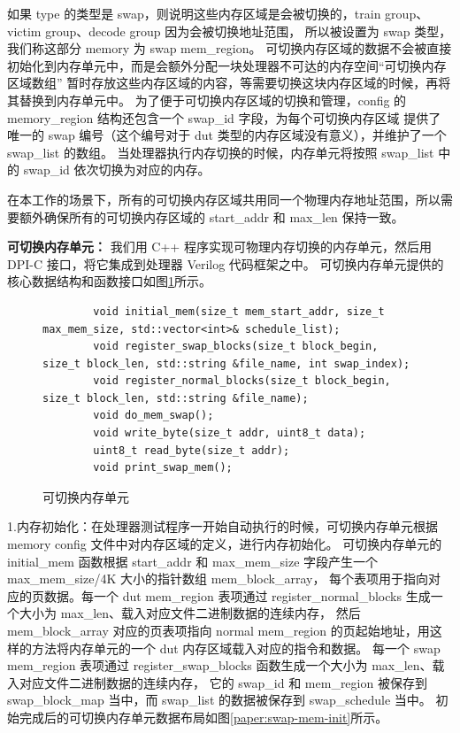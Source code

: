 如果 type 的类型是 swap，则说明这些内存区域是会被切换的，train group、victim group、decode group 因为会被切换地址范围，
所以被设置为 swap 类型，我们称这部分 memory 为 swap mem\_region。
可切换内存区域的数据不会被直接初始化到内存单元中，而是会额外分配一块处理器不可达的内存空间“可切换内存区域数组”
暂时存放这些内存区域的内容，等需要切换这块内存区域的时候，再将其替换到内存单元中。
为了便于可切换内存区域的切换和管理，config 的 memory\_region 结构还包含一个 swap\_id 字段，为每个可切换内存区域
提供了唯一的 swap 编号（这个编号对于 dut 类型的内存区域没有意义），并维护了一个 swap\_list 的数组。
当处理器执行内存切换的时候，内存单元将按照 swap\_list 中的 swap\_id 依次切换为对应的内存。\par 

在本工作的场景下，所有的可切换内存区域共用同一个物理内存地址范围，所以需要额外确保所有的可切换内存区域的 start\_addr
和 max\_len 保持一致。\par

\textbf{可切换内存单元：}
我们用 C++ 程序实现可物理内存切换的内存单元，然后用 DPI-C 接口，将它集成到处理器 Verilog 代码框架之中。
可切换内存单元提供的核心数据结构和函数接口如图\ref{code:swappable-memory}所示。\par

\begin{figure}[htbp]
    \centering
    \begin{verbatim}
        void initial_mem(size_t mem_start_addr, size_t max_mem_size, std::vector<int>& schedule_list);
        void register_swap_blocks(size_t block_begin, size_t block_len, std::string &file_name, int swap_index);
        void register_normal_blocks(size_t block_begin, size_t block_len, std::string &file_name);
        void do_mem_swap();
        void write_byte(size_t addr, uint8_t data);
        uint8_t read_byte(size_t addr);
        void print_swap_mem();
    \end{verbatim}
    \caption{可切换内存单元}
    \label{code:swappable-memory}
\end{figure}

1.内存初始化：在处理器测试程序一开始自动执行的时候，可切换内存单元根据 memory config 文件中对内存区域的定义，进行内存初始化。
可切换内存单元的 initial\_mem 函数根据 start\_addr 和 max\_mem\_size 字段产生一个 max\_mem\_size/4K 大小的指针数组 mem\_block\_array，
每个表项用于指向对应的页数据。每一个 dut mem\_region 表项通过 register\_normal\_blocks 生成一个大小为 max\_len、载入对应文件二进制数据的连续内存，
然后 mem\_block\_array 对应的页表项指向 normal mem\_region 的页起始地址，用这样的方法将内存单元的一个 dut 内存区域载入对应的指令和数据。
每一个 swap mem\_region 表项通过 register\_swap\_blocks 函数生成一个大小为 max\_len、载入对应文件二进制数据的连续内存，
它的 swap\_id 和 mem\_region 被保存到 swap\_block\_map 当中，而 swap\_list 的数据被保存到 swap\_schedule 当中。
初始完成后的可切换内存单元数据布局如图\ref{paper:swap-mem-init}所示。\par

